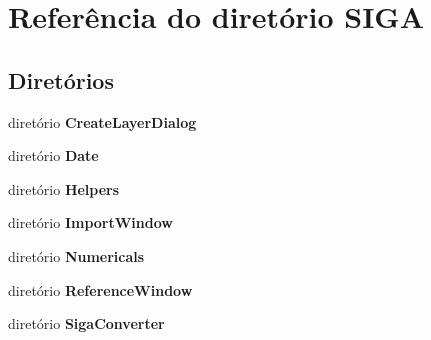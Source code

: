\section{Referência do diretório S\+I\+GA}
\label{dir_550659a6720cf09b2d90a5a260e45638}
\subsection*{Diretórios}
\begin{DoxyCompactItemize}
\item 
diretório {\bf Create\+Layer\+Dialog}
\item 
diretório {\bf Date}
\item 
diretório {\bf Helpers}
\item 
diretório {\bf Import\+Window}
\item 
diretório {\bf Numericals}
\item 
diretório {\bf Reference\+Window}
\item 
diretório {\bf Siga\+Converter}
\end{DoxyCompactItemize}
